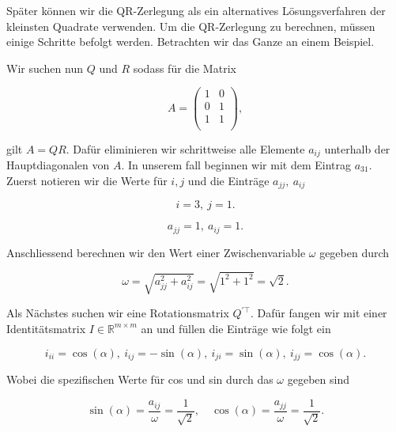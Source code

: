 Später können wir die QR-Zerlegung als ein alternatives Lösungsverfahren der kleinsten Quadrate verwenden. Um die QR-Zerlegung zu berechnen, müssen einige Schritte befolgt werden. Betrachten wir das Ganze an einem Beispiel.

\vspace{1\baselineskip}

Wir suchen nun \( Q \) und \( R \) sodass für die Matrix 

\begin{equation*}
    A = \begin{pmatrix}
        1 & 0 \\
        0 & 1 \\
        1 & 1 \\
    \end{pmatrix},
\end{equation*}

gilt \( A = QR \). Dafür eliminieren wir schrittweise alle Elemente \( a_{ij} \) unterhalb der Hauptdiagonalen von \( A \). In unserem fall beginnen wir mit dem Eintrag \( a_{31} \). Zuerst notieren wir die Werte für \( i, j \) und die Einträge \( a_{jj}, \ a_{ij} \) 

\begin{equation*}
    i = 3, \ j = 1. 
\end{equation*}

\begin{equation*}
    a_{jj} = 1, \ a_{ij} = 1.
\end{equation*}

Anschliessend berechnen wir den Wert einer Zwischenvariable \( \omega \) gegeben durch

\begin{equation*}
    \omega = \sqrt{a_{jj}^2 + a_{ij}^2} = \sqrt{1^2 + 1^2} = \sqrt{2}.
\end{equation*}

Als Nächstes suchen wir eine Rotationsmatrix \( Q^{\prime \top} \). Dafür fangen wir mit einer Identitätsmatrix \( I \in \mathbb{R}^{m \times m} \) an und füllen die Einträge wie folgt ein

\begin{equation*}
    i_{ii} = \cos(\alpha), \ i_{ij} = -\sin(\alpha), \ i_{ji} = \sin(\alpha), \ i_{jj} = \cos(\alpha).
\end{equation*}

Wobei die spezifischen Werte für cos und sin durch das \( \omega \) gegeben sind

\begin{equation*}
    \sin(\alpha) = \frac{a_{ij}}{\omega} = \frac{1}{\sqrt{2}}, \quad \cos(\alpha) = \frac{a_{jj}}{\omega} = \frac{1}{\sqrt{2}}.
\end{equation*}

